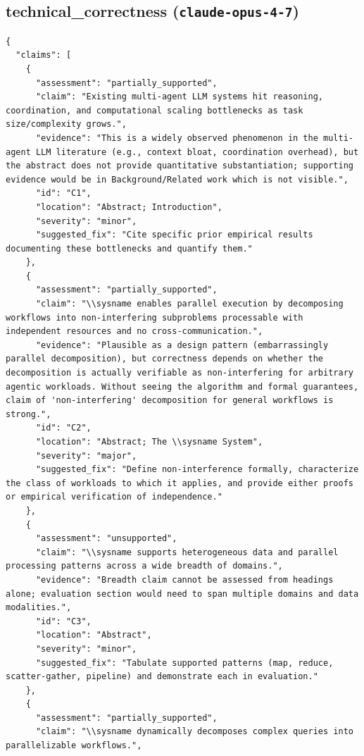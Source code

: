 \documentclass[11pt]{article}
\begin{document}
\subsection*{technical_correctness (\texttt{claude-opus-4-7})}
\begin{verbatim}
{
  "claims": [
    {
      "assessment": "partially_supported",
      "claim": "Existing multi-agent LLM systems hit reasoning, coordination, and computational scaling bottlenecks as task size/complexity grows.",
      "evidence": "This is a widely observed phenomenon in the multi-agent LLM literature (e.g., context bloat, coordination overhead), but the abstract does not provide quantitative substantiation; supporting evidence would be in Background/Related work which is not visible.",
      "id": "C1",
      "location": "Abstract; Introduction",
      "severity": "minor",
      "suggested_fix": "Cite specific prior empirical results documenting these bottlenecks and quantify them."
    },
    {
      "assessment": "partially_supported",
      "claim": "\\sysname enables parallel execution by decomposing workflows into non-interfering subproblems processable with independent resources and no cross-communication.",
      "evidence": "Plausible as a design pattern (embarrassingly parallel decomposition), but correctness depends on whether the decomposition is actually verifiable as non-interfering for arbitrary agentic workloads. Without seeing the algorithm and formal guarantees, claim of 'non-interfering' decomposition for general workflows is strong.",
      "id": "C2",
      "location": "Abstract; The \\sysname System",
      "severity": "major",
      "suggested_fix": "Define non-interference formally, characterize the class of workloads to which it applies, and provide either proofs or empirical verification of independence."
    },
    {
      "assessment": "unsupported",
      "claim": "\\sysname supports heterogeneous data and parallel processing patterns across a wide breadth of domains.",
      "evidence": "Breadth claim cannot be assessed from headings alone; evaluation section would need to span multiple domains and data modalities.",
      "id": "C3",
      "location": "Abstract",
      "severity": "minor",
      "suggested_fix": "Tabulate supported patterns (map, reduce, scatter-gather, pipeline) and demonstrate each in evaluation."
    },
    {
      "assessment": "partially_supported",
      "claim": "\\sysname dynamically decomposes complex queries into parallelizable workflows.",

\end{verbatim}
\end{document}
